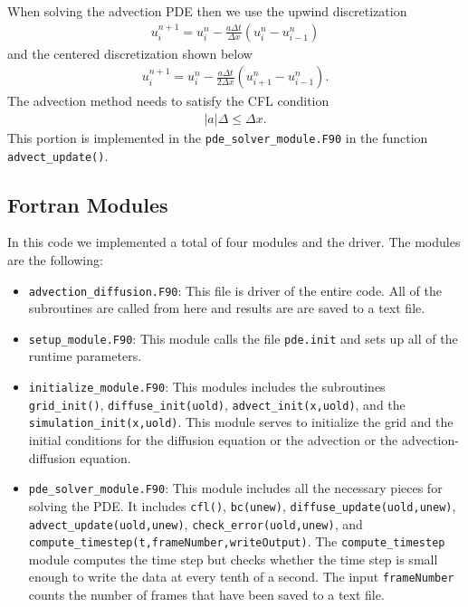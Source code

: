 \documentclass[12pt]{article}
\begin{document}
		When solving the advection PDE then we use the upwind discretization 
		\begin{align}
			u_i^{n+1} = u_i^n - \frac{a\Delta t}{\Delta x} (u_i^n - u_{i-1}^n)
		\end{align}
		and the centered discretization shown below
		\begin{align}
			u_i^{n+1} = u_i^n - \frac{a\Delta t}{2\Delta x} (u_{i+1}^n - u_{i-1}^n).
		\end{align}
		The advection method needs to satisfy the CFL condition
		\begin{align}
			|a| \Delta \leq \Delta x.
		\end{align}
		This portion is implemented in the \texttt{pde\_solver\_module.F90} in the function \texttt{advect\_update()}.

		
		\subsection{Fortran Modules}
		In this code we implemented a total of four modules and the driver. The modules are the following:
		\begin{itemize}
			\item \texttt{advection\_diffusion.F90}: This file is driver of the entire code. All of the subroutines are called from here and results are are saved to a text file. 
			\item \texttt{setup\_module.F90}: This module calls the file \texttt{pde.init} and sets up all of the runtime parameters.
			\item \texttt{initialize\_module.F90}: This modules includes the subroutines \texttt{grid\_init()}, \texttt{diffuse\_init(uold)}, \texttt{advect\_init(x,uold)}, and the \texttt{simulation\_init(x,uold)}. This module serves to initialize the grid and the initial conditions for the diffusion equation or the advection or the advection-diffusion equation.
			\item \texttt{pde\_solver\_module.F90}: This module includes all the necessary pieces for solving the PDE. It includes \texttt{cfl()}, \texttt{bc(unew)}, \texttt{diffuse\_update(uold,unew)}, \texttt{advect\_update(uold,unew)}, \texttt{check\_error(uold,unew)}, and \linebreak\texttt{compute\_timestep(t,frameNumber,writeOutput)}. The \texttt{compute\_timestep} module computes the time step but checks whether the time step is small enough to write the data at every tenth of a second. The input \texttt{frameNumber} counts the number of frames that have been saved to a text file. 
		\end{itemize}
\end{document}
